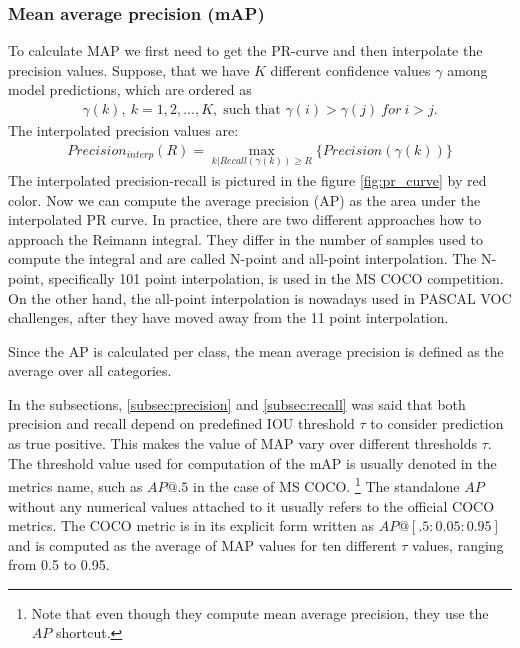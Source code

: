 \subsubsection{Mean average precision (mAP)}
To calculate MAP we first need to get the PR-curve and then interpolate the precision values. Suppose, that we have $K$ different confidence values $\gamma$ among model predictions, which are ordered as
\begin{align}
    \gamma(k),\: k = 1,2,...,K,  \; \text{such that } \gamma(i) > \gamma(j) \: for \: i > j.
\end{align}
The interpolated precision values are:
\begin{align}
    Precision_{interp}(R) = \max_{k|Recall(\gamma(k)) \geq R} \{  Precision(\gamma(k)) \}
\end{align}
The interpolated precision-recall is pictured in the figure \ref{fig:pr_curve} by red color. Now we can compute the average precision (AP) as the area under the interpolated PR curve.
In practice, there are two different approaches how to approach the Reimann integral. They differ in the number of samples used to compute the integral and are called N-point and all-point interpolation. The N-point, specifically 101 point interpolation, is used in the MS COCO competition. On the other hand, the all-point interpolation is nowadays used in PASCAL VOC challenges, after they have moved away from the 11 point interpolation.


Since the AP is calculated per class, the mean average precision is defined as the average over all categories.

In the subsections, \ref{subsec:precision} and \ref{subsec:recall} was said that both precision and recall depend on predefined IOU threshold $\tau$ to consider prediction as true positive. This makes the value of MAP vary over different thresholds $\tau$. The threshold value used for computation of the mAP is usually denoted in the metrics name, such as $AP@.5$ in the case of MS COCO. \footnote{Note that even though they compute mean average precision, they use the $AP$ shortcut.} The standalone $AP$ without any numerical values attached to it usually refers to the official COCO metrics. The COCO metric is in its explicit form written as $AP@[.5:0.05:0.95]$ and is computed as the average of MAP values for ten different $\tau$ values, ranging from 0.5 to 0.95.

